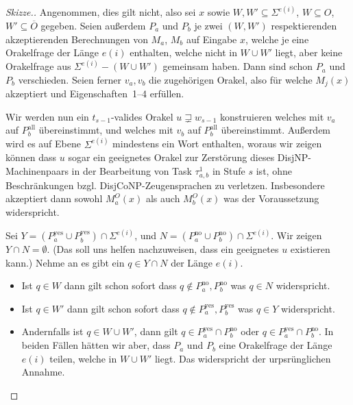 \documentclass[nofonts]{uebung}
\theoremstyle{definition}
\begin{document}
\begin{proof}[Skizze.]
    Angenommen, dies gilt nicht, also sei $x$ sowie $W,W'\subseteq \Sigma^{e(i)}$, $W\subseteq O$, $W'\subseteq\overline{O}$ gegeben.
    Seien außerdem $P_a$ und $P_b$ je zwei $(W, W')$ respektierenden akzeptierenden Berechnungen von $M_a$, $M_b$ auf Eingabe $x$,
    welche je eine Orakelfrage der Länge $e(i)$ enthalten, welche nicht in $W\cup W'$ liegt,
    aber keine Orakelfrage aus $\Sigma^{e(i)}-(W\cup W')$ gemeinsam haben.
    Dann sind schon $P_a$ und $P_b$ verschieden.
    Seien ferner $v_a, v_b$ die zugehörigen Orakel, also für welche $M_j(x)$ akzeptiert und Eigenschaften~1--4 erfüllen.

    Wir werden nun ein $t_{s-1}$-valides Orakel $u\sqsupsetneq w_{s-1}$ konstruieren welches mit $v_a$ auf $P^\mathrm{all}_b$ übereinstimmt, und welches mit $v_b$ auf $P^\mathrm{all}_b$ übereinstimmt.
    Außerdem wird es auf Ebene $\Sigma^{e(i)}$ mindestens ein Wort enthalten, woraus wir zeigen können dass $u$ sogar ein geeignetes Orakel zur Zerstörung dieses DisjNP-Machinenpaars in der Bearbeitung von Task $\tau^1_{a,b}$ in Stufe $s$ ist, ohne Beschränkungen bzgl. DisjCoNP-Zeugensprachen zu verletzen. Insbesondere akzeptiert dann sowohl $M_a^O(x)$ als auch $M_b^O(x)$ was der Voraussetzung widerspricht.

    Sei $Y=(P^\mathrm{yes}_a\cup P^\mathrm{yes}_b)\cap\Sigma^{e(i)}$, und $N=(P^\mathrm{no}_a\cup P^\mathrm{no}_b)\cap\Sigma^{e(i)}$.
    Wir zeigen $Y\cap N = \emptyset$. (Das soll uns helfen nachzuweisen, dass ein geeignetes $u$ existieren kann.)
    Nehme an es gibt ein $q\in Y\cap N$ der Länge $e(i)$.
    \begin{itemize}[noitemsep]
        \item Ist $q\in W$ dann gilt schon sofort dass $q\not\in P^\mathrm{no}_a, P^\mathrm{no}_b$ was $q\in N$ widerspricht.
        \item Ist $q\in W'$ dann gilt schon sofort dass $q\not\in P^\mathrm{yes}_a, P^\mathrm{yes}_b$ was $q\in Y$ widerspricht.
        \item Andernfalls ist $q\in  W\cup W'$, dann gilt $q\in P^\mathrm{yes}_a\cap P^\mathrm{no}_b$ oder $q\in P^\mathrm{yes}_a\cap P^\mathrm{no}_b$.
            In beiden Fällen hätten wir aber, dass $P_a$ und $P_b$ eine Orakelfrage der Länge $e(i)$ teilen, welche in $W\cup W'$ liegt. Das widerspricht der urpsrünglichen Annahme.
    \end{itemize}


\end{proof}
\end{document}
